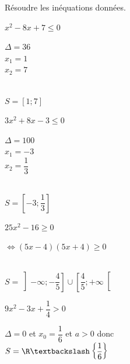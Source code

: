 \documentclass[12pt,a4paper]{article}  %
\begin{document}
Résoudre les inéquations données.
\begin{enumMet}
    \item {} $x^{2}-8 x+7 \leqslant 0$\quad {}
    \begin{corrBox}
    	$\Delta=36$\\
    	$x_1=1$\\
    	$x_2=7$\\
    	\\
    	$S=\left[1;7\right]$
    \end{corrBox}
    \item $3 x^{2}+8 x-3 \leqslant 0$\quad {}
    \begin{corrBox}
    	$\Delta=100$\\
    	$x_1=-3$\\
    	$x_2=\dfrac{1}{3}$\\
    	\\
    	$S=\left[-3;\dfrac{1}{3}\right]$
    \end{corrBox}
    \item $25 x^{2}-16 \geqslant 0$\quad {}
    \begin{corrBox}
    	$\iff (5x-4)(5x+4) \geqslant 0$\\
    	\\
    	$S=\left]-\infty;-\dfrac{4}{5}\right]\cup\left[\dfrac{4}{5}; +\infty\right[$
    \end{corrBox}
    \item $9 x^{2}-3x+\dfrac{1}{4}>0$\quad {}
    \begin{corrBox}
    	$\Delta=0$ et $x_0=\dfrac{1}{6}$ et $a>0$ donc\\ $S=\R\textbackslash\left\{\dfrac{1}{6}\right\}$
    \end{corrBox}
\end{enumMet}
\end{document}
